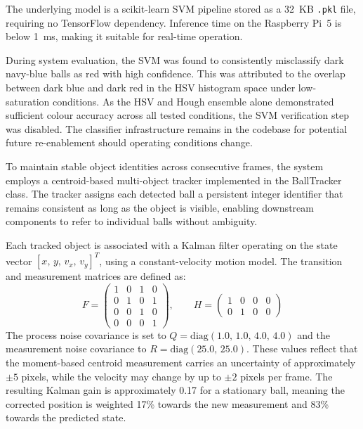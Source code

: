 The underlying model is a scikit-learn SVM pipeline stored as a 32~KB
\texttt{.pkl} file, requiring no TensorFlow dependency. Inference time on the
Raspberry Pi~5 is below 1~ms, making it suitable for real-time operation.

During system evaluation, the SVM was found to consistently misclassify dark
navy-blue balls as red with high confidence. This was attributed to the overlap
between dark blue and dark red in the HSV histogram space under low-saturation
conditions. As the HSV and Hough ensemble alone demonstrated sufficient colour
accuracy across all tested conditions, the SVM verification step was disabled.
The classifier infrastructure remains in the codebase for potential future
re-enablement should operating conditions change.

\label{sec:tracking}

To maintain stable object identities across consecutive frames, the system employs
a centroid-based multi-object tracker implemented in the BallTracker class. The
tracker assigns each detected ball a persistent integer identifier that remains
consistent as long as the object is visible, enabling downstream components to
refer to individual balls without ambiguity.

Each tracked object is associated with a Kalman filter operating on the state
vector $[x,\, y,\, v_x,\, v_y]^T$, using a constant-velocity motion model. The
transition and measurement matrices are defined as:
\begin{equation}
    F = \begin{pmatrix} 1 & 0 & 1 & 0 \\ 0 & 1 & 0 & 1 \\
    0 & 0 & 1 & 0 \\ 0 & 0 & 0 & 1 \end{pmatrix}, \qquad
    H = \begin{pmatrix} 1 & 0 & 0 & 0 \\ 0 & 1 & 0 & 0 \end{pmatrix}
\end{equation}
The process noise covariance is set to $Q = \mathrm{diag}(1.0,\, 1.0,\, 4.0,\,
4.0)$ and the measurement noise covariance to $R = \mathrm{diag}(25.0,\, 25.0)$.
These values reflect that the moment-based centroid measurement carries an
uncertainty of approximately $\pm 5$ pixels, while the velocity may change by up
to $\pm 2$ pixels per frame. The resulting Kalman gain is approximately 0.17 for a
stationary ball, meaning the corrected position is weighted 17\% towards the new
measurement and 83\% towards the predicted state.

